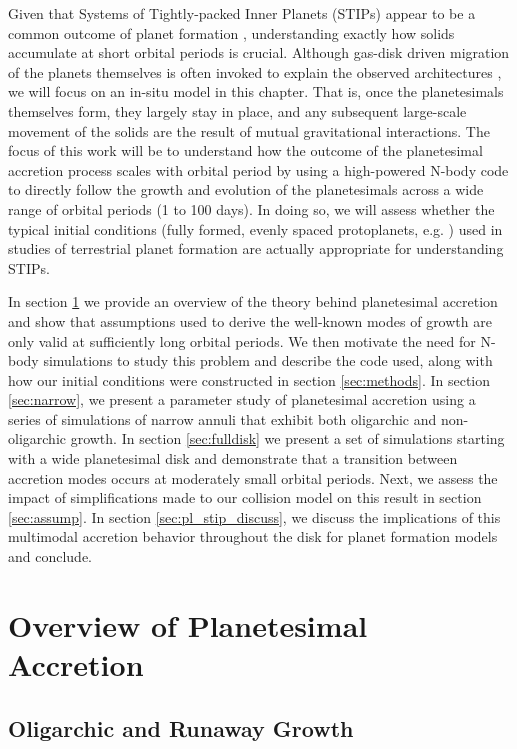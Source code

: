 Given that Systems of Tightly-packed Inner Planets (STIPs) appear to
be a common outcome of planet formation \cite{lantham11, lissauer11, rowe14}, understanding exactly how
solids accumulate at short orbital periods is crucial. Although
gas-disk driven migration of the planets themselves is often invoked
to explain the observed architectures \cite{izidoro17, izidoro21}, we will focus on an in-situ
model in this chapter. That is, once the planetesimals themselves form,
they largely stay in place, and any subsequent large-scale movement of
the solids are the result of mutual gravitational interactions. The
focus of this work will be to understand how the outcome of the
planetesimal accretion process scales with orbital period by using a
high-powered N-body code to directly follow the growth and evolution
of the planetesimals across a wide range of orbital periods (1 to 100
days). In doing so, we will assess whether the typical initial conditions (fully formed, evenly spaced protoplanets, e.g. \cite{raymond06}) used in studies of terrestrial planet formation are actually appropriate for understanding STIPs.

In section \ref{sec:theory} we provide an overview of the theory
behind planetesimal accretion and show that assumptions used to derive
the well-known modes of growth are only valid at sufficiently long
orbital periods. We then motivate the need for N-body simulations to
study this problem and describe the code used, along with how our
initial conditions were constructed in section \ref{sec:methods}. In
section \ref{sec:narrow}, we present a parameter study of planetesimal
accretion using a series of simulations of narrow annuli that exhibit both oligarchic and non-oligarchic growth. In section 
\ref{sec:fulldisk} we present a set of simulations starting with a  wide planetesimal disk and demonstrate that a transition 
between accretion modes occurs at moderately small orbital periods. Next, we assess the impact of 
simplifications made to our collision model on this result in section \ref{sec:assump}. In section \ref{sec:pl_stip_discuss}, we discuss the 
implications of this multimodal accretion behavior throughout the disk for planet formation models and conclude.

\section{Overview of Planetesimal Accretion}\label{sec:theory}

\subsection{Oligarchic and Runaway Growth}

